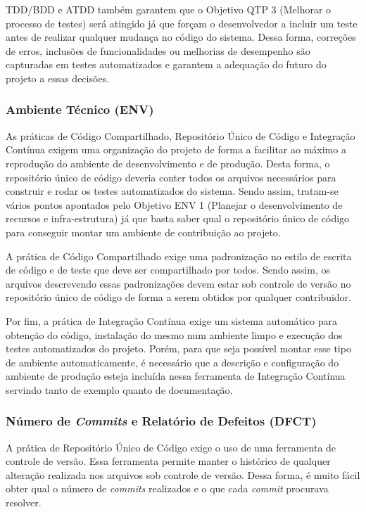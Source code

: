 TDD/BDD e ATDD também garantem que o Objetivo QTP 3 (Melhorar o
processo de testes) será atingido já que forçam o desenvolvedor a
incluir um teste antes de realizar qualquer mudança no código do
sistema. Dessa forma, correções de erros, inclusões de funcionalidades
ou melhorias de desempenho são capturadas em testes automatizados e
garantem a adequação do futuro do projeto a essas decisões.

\subsubsection{Ambiente Técnico (ENV)}
\label{sec:+env}

As práticas de Código Compartilhado, Repositório Único de Código e
Integração Contínua exigem uma organização do projeto de forma a
facilitar ao máximo a reprodução do ambiente de desenvolvimento e de
produção. Desta forma, o repositório único de código deveria conter
todos os arquivos necessários para construir e rodar os testes
automatizados do sistema. Sendo assim, tratam-se vários pontos
apontados pelo Objetivo ENV 1 (Planejar o desenvolvimento de recursos
e infra-estrutura) já que basta saber qual o repositório único de
código para conseguir montar um ambiente de contribuição ao projeto.

A prática de Código Compartilhado exige uma padronização no estilo de
escrita de código e de teste que deve ser compartilhado por
todos. Sendo assim, os arquivos descrevendo essas padronizações devem
estar sob controle de versão no repositório único de código de forma a
serem obtidos por qualquer contribuidor.

Por fim, a prática de Integração Contínua exige um sistema automático
para obtenção do código, instalação do mesmo num ambiente limpo e
execução dos testes automatizados do projeto. Porém, para que seja
possível montar esse tipo de ambiente automaticamente, é necessário
que a descrição e configuração do ambiente de produção esteja incluída
nessa ferramenta de Integração Contínua servindo tanto de exemplo
quanto de documentação.

\subsubsection{Número de \textit{Commits} e Relatório de Defeitos
  (DFCT)}
\label{sec:+dfct}

A prática de Repositório Único de Código exige o uso de uma ferramenta
de controle de versão. Essa ferramenta permite manter o histórico de
qualquer alteração realizada nos arquivos sob controle de
versão. Dessa forma, é muito fácil obter qual o número de
\textit{commits} realizados e o que cada \textit{commit} procurava
resolver.

